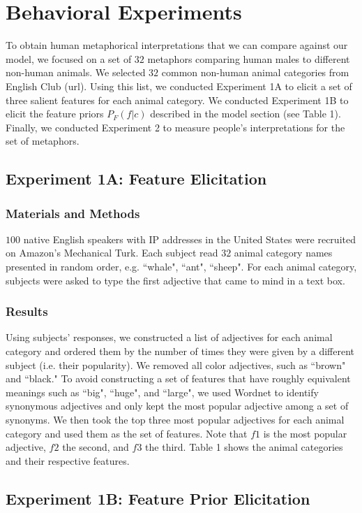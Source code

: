 \documentclass[10pt,letterpaper]{article}
\begin{document}
\section{Behavioral Experiments}
To obtain human metaphorical interpretations that we can compare against our model, we focused on a set of $32$ metaphors comparing human males to different non-human animals. We selected $32$ common non-human animal categories from English Club (url). Using this list, we conducted Experiment 1A to elicit a set of three salient features for each animal category. We conducted Experiment 1B to elicit the feature priors $P_F(f | c)$ described in the model section (see Table 1). Finally, we conducted Experiment 2 to measure people's interpretations for the set of metaphors. 

\subsection{Experiment 1A: Feature Elicitation}
\subsubsection{Materials and Methods}
$100$ native English speakers with IP addresses in the United States were recruited on Amazon's Mechanical Turk. Each subject read $32$ animal category names presented in random order, e.g. ``whale", ``ant", ``sheep". For each animal category, subjects were asked to type the first adjective that came to mind in a text box. 
\subsubsection{Results}
Using subjects' responses, we constructed a list of adjectives for each animal category and ordered them by the number of times they were given by a different subject (i.e. their popularity). We removed all color adjectives, such as ``brown" and ``black." To avoid constructing a set of features that have roughly equivalent meanings such as ``big", ``huge", and ``large", we used Wordnet to identify synonymous adjectives and only kept the most popular adjective among a set of synonyms. We then took the top three most popular adjectives for each animal category and used them as the set of features. Note that $f1$ is the most popular adjective, $f2$ the second, and $f3$ the third. Table 1 shows the animal categories and their respective features.
\subsection{Experiment 1B: Feature Prior Elicitation}
\end{document}
